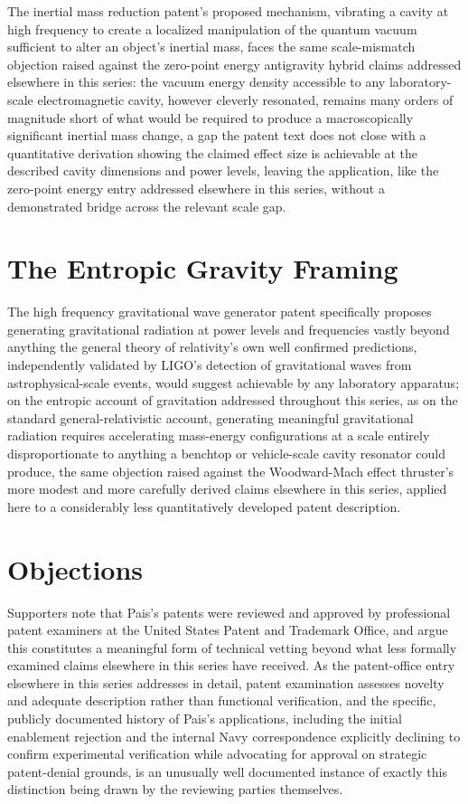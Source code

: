 \documentclass[11pt]{article}
\begin{document}
The inertial mass reduction patent's proposed mechanism, vibrating a cavity at high frequency to create a localized manipulation of the quantum vacuum sufficient to alter an object's inertial mass, faces the same scale-mismatch objection raised against the zero-point energy antigravity hybrid claims addressed elsewhere in this series: the vacuum energy density accessible to any laboratory-scale electromagnetic cavity, however cleverly resonated, remains many orders of magnitude short of what would be required to produce a macroscopically significant inertial mass change, a gap the patent text does not close with a quantitative derivation showing the claimed effect size is achievable at the described cavity dimensions and power levels, leaving the application, like the zero-point energy entry addressed elsewhere in this series, without a demonstrated bridge across the relevant scale gap.

\section{The Entropic Gravity Framing}

The high frequency gravitational wave generator patent specifically proposes generating gravitational radiation at power levels and frequencies vastly beyond anything the general theory of relativity's own well confirmed predictions, independently validated by LIGO's detection of gravitational waves from astrophysical-scale events, would suggest achievable by any laboratory apparatus; on the entropic account of gravitation addressed throughout this series, as on the standard general-relativistic account, generating meaningful gravitational radiation requires accelerating mass-energy configurations at a scale entirely disproportionate to anything a benchtop or vehicle-scale cavity resonator could produce, the same objection raised against the Woodward-Mach effect thruster's more modest and more carefully derived claims elsewhere in this series, applied here to a considerably less quantitatively developed patent description.

\section{Objections}

Supporters note that Pais's patents were reviewed and approved by professional patent examiners at the United States Patent and Trademark Office, and argue this constitutes a meaningful form of technical vetting beyond what less formally examined claims elsewhere in this series have received. As the patent-office entry elsewhere in this series addresses in detail, patent examination assesses novelty and adequate description rather than functional verification, and the specific, publicly documented history of Pais's applications, including the initial enablement rejection and the internal Navy correspondence explicitly declining to confirm experimental verification while advocating for approval on strategic patent-denial grounds, is an unusually well documented instance of exactly this distinction being drawn by the reviewing parties themselves.
\end{document}
